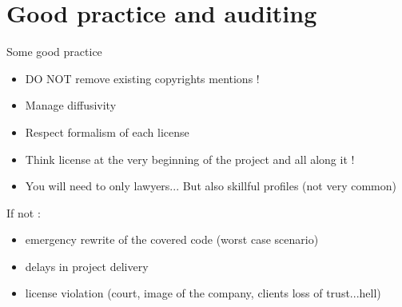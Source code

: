 \documentclass{beamer}
\begin{document}
\section{Good practice and auditing}

\begin{frame}{Some good practice}
  \begin{itemize}
  \item DO NOT remove existing copyrights mentions !
  \item Manage diffusivity
  \item Respect formalism of each license
  \item Think license at the very beginning of the project and all along it !
  \item You will need to only lawyers... But also skillful profiles (not very common)
  \end{itemize}

If not :

\begin{itemize}
\item emergency rewrite of the covered code (worst case scenario)
\item delays in project delivery
\item license violation (court, image of the company, clients loss of trust...hell)
\end{itemize}
  
\end{frame}
\end{document}
